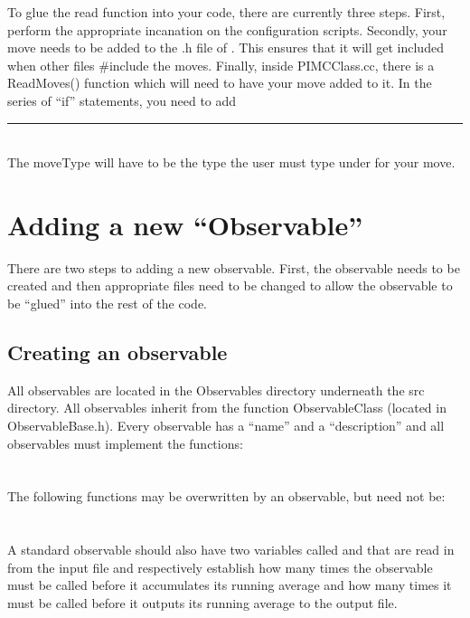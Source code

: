 \documentclass{book}
\begin{document}
{To glue the read function into your code, there are currently three
steps. First, perform the appropriate incanation on the configuration scripts.
Secondly,  your move needs
to be added to the .h file of . This ensures that it will
get included when other files \#include the moves. Finally, inside
PIMCClass.cc, there is a ReadMoves() function which will need to have your
move added to it.  In the series of ``if'' statements, you need to add
\\
\rule{0.6cm}{0cm}\\
The moveType will have to be the type the user must type under
 for your move.




\section{Adding a new ``Observable''}
There are two steps to adding a new observable. First, the observable
needs to be created and then appropriate files need to be changed to
allow the observable to be ``glued'' into the rest of the code.
\subsection{Creating an observable}
All observables are located in the Observables directory underneath
the src directory. All observables inherit from the function
ObservableClass (located in ObservableBase.h). Every observable has a
``name'' and a ``description'' and all
observables must implement the functions: \\
 \\
 \\ 
The following functions may be overwritten by an observable, but need
not be: \\
 \\
 \\
A standard observable should also have two variables called  and
 that are read in from the input file and respectively
establish how many times the observable must be called before it
accumulates its running average and how many times it must be called
before it outputs its running average to the output file.

}
\end{document}
